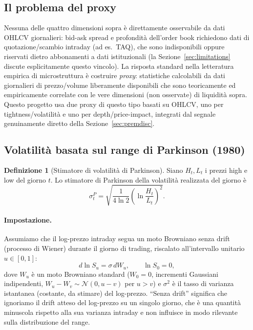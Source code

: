\documentclass[11pt]{article}
\theoremstyle{definition}
\newtheorem{definition}[theorem]{Definizione}
\theoremstyle{remark}
\begin{document}
\subsection{Il problema del proxy}

Nessuna delle quattro dimensioni sopra \`e direttamente osservabile da dati OHLCV giornalieri: bid-ask spread e profondit\`a dell'order book richiedono dati di quotazione/scambio intraday (ad es.\ TAQ), che sono indisponibili oppure riservati dietro abbonamenti a dati istituzionali (la Sezione~\ref{sec:limitations} discute esplicitamente questo vincolo). La risposta standard nella letteratura empirica di microstruttura \`e costruire \emph{proxy}: statistiche calcolabili da dati giornalieri di prezzo/volume liberamente disponibili che sono teoricamente ed empiricamente correlate con le vere dimensioni (non osservate) di liquidit\`a sopra. Questo progetto usa due proxy di questo tipo basati su OHLCV, uno per tightness/volatilit\`a e uno per depth/price-impact, integrati dal segnale genuinamente diretto della Sezione~\ref{sec:premdisc}.

\subsection{Volatilit\`a basata sul range di Parkinson (1980)}
\label{sec:parkinson}

\begin{definition}[Stimatore di volatilit\`a di Parkinson]
Siano $H_t,L_t$ i prezzi high e low del giorno $t$. Lo stimatore di Parkinson della volatilit\`a realizzata del giorno \`e
\[
\sigma^{P}_t = \sqrt{\frac{1}{4\ln 2}\left(\ln\frac{H_t}{L_t}\right)^2}.
\]
\end{definition}

\paragraph{Impostazione.} Assumiamo che il log-prezzo intraday segua un moto Browniano senza drift (processo di Wiener) durante il giorno di trading, riscalato all'intervallo unitario $u\in[0,1]$:
\[
d\ln S_u = \sigma\,dW_u, \qquad \ln S_0 = 0,
\]
dove $W_u$ \`e un moto Browniano standard ($W_0=0$, incrementi Gaussiani indipendenti, $W_u-W_v\sim\mathcal N(0,u-v)$ per $u>v$) e $\sigma^2$ \`e il tasso di varianza istantanea (costante, da stimare) del log-prezzo. ``Senza drift'' significa che ignoriamo il drift atteso del log-prezzo su un singolo giorno, che \`e una quantit\`a minuscola rispetto alla sua varianza intraday e non influisce in modo rilevante sulla distribuzione del range.
\end{document}
